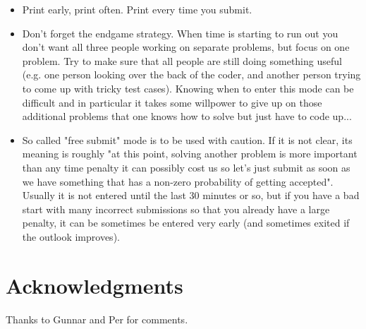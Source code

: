 \documentclass{article}
\begin{document}
\begin{itemize}
  \item Print early, print often. Print every time you submit.

  \item Don't forget the endgame strategy.  When time is starting to run out you
  don't want all three people working on separate problems, but focus on one
  problem.  Try to make sure that all people are still doing something useful
  (e.g. one person looking over the back of the coder, and another person trying
  to come up with tricky test cases). Knowing when to enter this mode can be
  difficult and in particular it takes some willpower to give up on those
  additional problems that one knows how to solve but just have to code up...

  \item So called "free submit" mode is to be used with caution. If it is
  not clear, its meaning is roughly "at this point, solving another problem is
  more important than any time penalty it can possibly cost us so let's just
  submit as soon as we have something that has a non-zero probability of getting
  accepted". Usually it is not entered until the last 30 minutes or so, but if
  you have a bad start with many incorrect submissions so that you already have
  a large penalty, it can be sometimes be entered very early (and sometimes
  exited if the outlook improves).
\end{itemize}


\section*{Acknowledgments}
Thanks to Gunnar and Per for comments.

\ifdefined\notebookstrategy
\else
\end{document}

